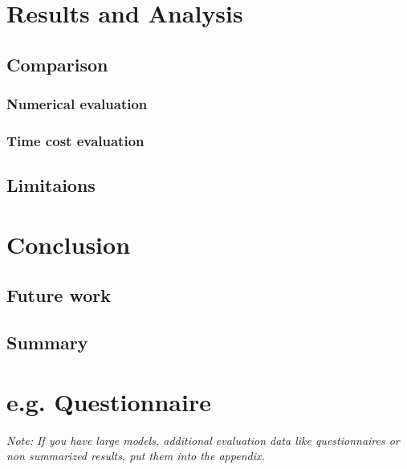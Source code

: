 \documentclass[a4paper,12pt,twoside]{report}
\begin{document}

\chapter{Results and Analysis}

\section{Comparison}

\subsection{Numerical evaluation}

\subsection{Time cost evaluation}

\section{Limitaions}






\chapter{Conclusion}
\section{Future work}
\section{Summary}






\appendix

\chapter{e.g. Questionnaire}

\textit{Note: If you have large models, additional evaluation data like questionnaires or non summarized results, put them into the appendix.}


\clearpage

\listoffigures
\clearpage

\listoftables
\clearpage



\end{document}
